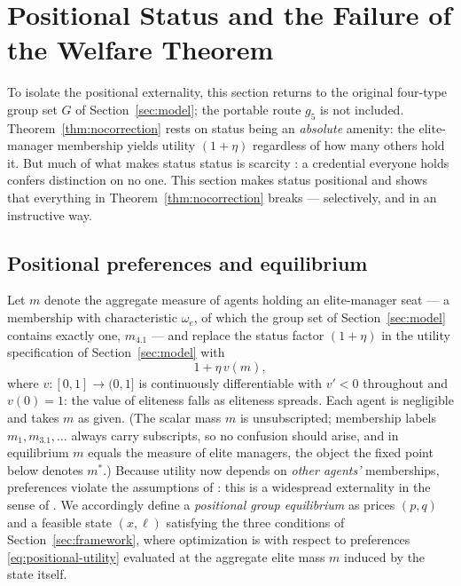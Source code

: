 \documentclass[12pt,letterpaper]{article}
\theoremstyle{definition}
\begin{document}
\section{Positional Status and the Failure of the Welfare Theorem}\label{sec:positional}

To isolate the positional externality, this section returns to the original four-type
group set $G$ of Section~\ref{sec:model}; the portable route $g_5$ is not included.
Theorem~\ref{thm:nocorrection} rests on status being an \emph{absolute} amenity: the elite-manager membership yields utility $(1+\eta)$ regardless of how many others hold it.
But much of what makes status status is scarcity \citep{hirsch1976social,frank1985demand}: a credential everyone holds confers distinction on no one.
This section makes status positional and shows that everything in Theorem~\ref{thm:nocorrection} breaks --- selectively, and in an instructive way.

\subsection{Positional preferences and equilibrium}

Let $m$ denote the aggregate measure of agents holding an elite-manager seat --- a membership with characteristic $\omega_e$, of which the group set of Section~\ref{sec:model} contains exactly one, $m_{4.1}$ --- and replace the status factor $(1+\eta)$ in the utility specification of Section~\ref{sec:model} with
\begin{equation}\label{eq:positional-utility}
  1 + \eta\, v(m),
\end{equation}
where $v:[0,1]\rightarrow(0,1]$ is continuously differentiable with $v'<0$ throughout and $v(0)=1$: the value of eliteness falls as eliteness spreads.
Each agent is negligible and takes $m$ as given.
(The scalar mass $m$ is unsubscripted; membership labels $m_1,m_{3.1},\dots$ always carry subscripts, so no confusion should arise, and in equilibrium $m$ equals the measure of elite managers, the object the fixed point below denotes $m^\ast$.)
Because utility now depends on \emph{other agents'} memberships, preferences violate the assumptions of \citet{ellickson2006organization}: this is a widespread externality in the sense of \citet{noguchizame2006externalities}.
We accordingly define a \emph{positional group equilibrium} as prices $(p,q)$ and a feasible state $(x,\ell)$ satisfying the three conditions of Section~\ref{sec:framework}, where optimization is with respect to preferences \eqref{eq:positional-utility} evaluated at the aggregate elite mass $m$ induced by the state itself.
\end{document}
